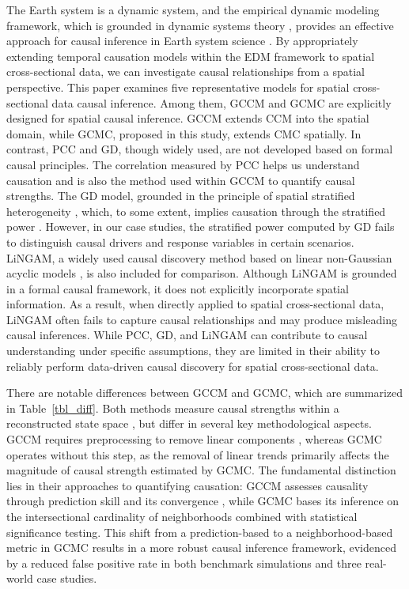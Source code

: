 \documentclass[authoryear,preprint,review,12pt]{elsarticle}
\begin{document}
The Earth system is a dynamic system, and the empirical dynamic modeling framework, which is grounded in dynamic systems theory \citep{ma2017cme,leng2020pcm,tao2023cmc}, provides an effective approach for causal inference in Earth system science \citep{gao2023gccm}. By appropriately extending temporal causation models within the EDM framework to spatial cross-sectional data, we can investigate causal relationships from a spatial perspective. This paper examines five representative models for spatial cross-sectional data causal inference. Among them, GCCM and GCMC are explicitly designed for spatial causal inference. GCCM extends CCM into the spatial domain, while GCMC, proposed in this study, extends CMC spatially. In contrast, PCC and GD, though widely used, are not developed based on formal causal principles. The correlation measured by PCC helps us understand causation and is also the method used within GCCM to quantify causal strengths. The GD model, grounded in the principle of spatial stratified heterogeneity \citep{wang2010gd1,wang2016gd2,lyu2025gdverse}, which, to some extent, implies causation through the stratified power \citep{wang2024gd3}. However, in our case studies, the stratified power computed by GD fails to distinguish causal drivers and response variables in certain scenarios. LiNGAM, a widely used causal discovery method based on linear non-Gaussian acyclic models \citep{shimizu2011lingam}, is also included for comparison. Although LiNGAM is grounded in a formal causal framework, it does not explicitly incorporate spatial information. As a result, when directly applied to spatial cross-sectional data, LiNGAM often fails to capture causal relationships and may produce misleading causal inferences. While PCC, GD, and LiNGAM can contribute to causal understanding under specific assumptions, they are limited in their ability to reliably perform data-driven causal discovery for spatial cross-sectional data.

There are notable differences between GCCM and GCMC, which are summarized in Table~\ref{tbl_diff}. Both methods measure causal strengths within a reconstructed state space \citep{Takens1981embedding,Mane1981embedding,sugihara2012ccm}, but differ in several key methodological aspects. GCCM requires preprocessing to remove linear components \citep{gao2023gccm}, whereas GCMC operates without this step, as the removal of linear trends primarily affects the magnitude of causal strength estimated by GCMC. The fundamental distinction lies in their approaches to quantifying causation: GCCM assesses causality through prediction skill and its convergence \citep{sugihara2012ccm,gao2023gccm}, while GCMC bases its inference on the intersectional cardinality of neighborhoods combined with statistical significance testing. This shift from a prediction-based to a neighborhood-based metric in GCMC results in a more robust causal inference framework, evidenced by a reduced false positive rate in both benchmark simulations and three real-world case studies.
\end{document}
